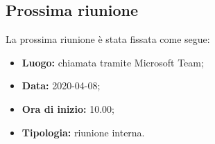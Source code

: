 	\subsection{Prossima riunione}
		La prossima riunione è stata fissata come segue: 
		\begin{itemize}
			\item \textbf{Luogo: } chiamata tramite Microsoft Team; 
			\item \textbf{Data: } 2020-04-08; 
			\item \textbf{Ora di inizio: } 10.00;
			\item \textbf{Tipologia: } riunione interna.
		\end{itemize}